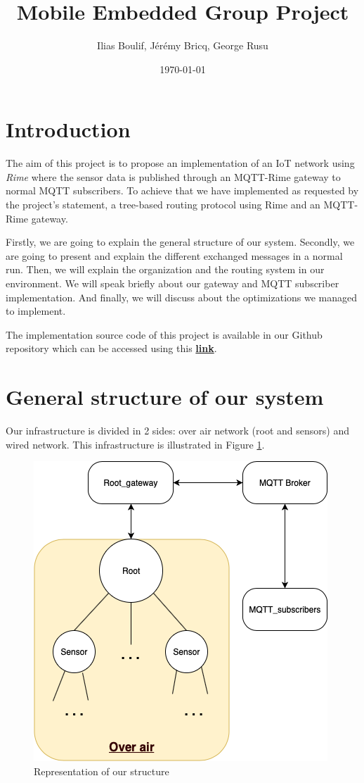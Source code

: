 \documentclass[a4paper,10pt]{article}
\title{Mobile Embedded Group Project}
\author{Ilias Boulif, Jérémy Bricq, George Rusu}
\date{\today}
\begin{document}
\maketitle
\section{Introduction}

The aim of this project is to propose an implementation of an IoT network using \textit{Rime} where the sensor data is published through an MQTT-Rime gateway to normal MQTT subscribers. To achieve that we have implemented as requested by the project's statement, a tree-based routing protocol using Rime and an MQTT-Rime gateway.

Firstly, we are going to explain the general structure of our system. Secondly, we are going to present and explain the different exchanged messages in a normal run. Then, we will explain the organization and the routing system in our environment. We will speak briefly about our gateway and MQTT subscriber implementation. And finally, we will discuss about the optimizations we managed to implement.

The implementation source code of this project is available in our Github repository which can be accessed using this \href{https://github.com/georgesrusu/MobileEmbeddedComputing}{\textbf{link}}.


\section{General structure of our system}
Our infrastructure is divided in 2 sides: over air network (root and sensors) and wired network. This infrastructure is illustrated in Figure \ref{fig:fig1}.

\begin{figure}[!htb]
\centering
\includegraphics[scale=0.5]{./img/structure.png}
\caption{Representation of our structure}
\label{fig:fig1}
\end{figure}
\end{document}
